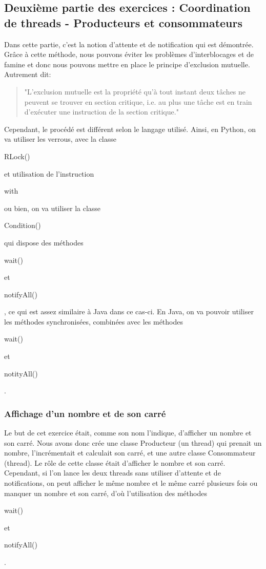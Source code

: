 \documentclass{article}
\begin{document}
\subsection{Deuxième partie des exercices : Coordination de threads - Producteurs et consommateurs}
\label{section : deuxiemepartie}

Dans cette partie, c'est la notion d'attente et de notification qui est démontrée. Grâce à cette méthode, nous pouvons éviter les problèmes d'interblocages et de famine et donc nous pouvons mettre en place le principe d'exclusion mutuelle. Autrement dit: \begin{quote}\begin{it}"L'exclusion mutuelle est la propriété qu'à tout instant deux tâches ne peuvent se trouver en section critique, i.e. au plus une tâche est en train d'exécuter une instruction de la section critique."\end{it}\end{quote}
Cependant, le procédé est différent selon le langage utilisé. Ainsi, en Python, on va utiliser les verrous, avec la classe \begin{it}RLock()\end{it} et utilisation de l'instruction \begin{it}with\end{it} ou bien, on va utiliser la classe \begin{it}Condition()\end{it} qui dispose des méthodes \begin{it}wait()\end{it} et \begin{it}notifyAll()\end{it}, ce qui est assez similaire à Java dans ce cas-ci.
En Java, on va pouvoir utiliser les méthodes synchronisées, combinées avec les méthodes \begin{it}wait()\end{it} et \begin{it}notityAll()\end{it}.

\subsubsection{Affichage d'un nombre et de son carré}
\label{section : carre}

Le but de cet exercice était, comme son nom l'indique, d'afficher un nombre et son carré. Nous avons donc crée une classe Producteur (un thread) qui prenait un nombre, l'incrémentait et calculait son carré, et une autre classe Consommateur (thread). Le rôle de cette classe était d'afficher le nombre et son carré. Cependant, si l'on lance les deux threads sans utiliser d'attente et de notifications, on peut afficher le même nombre et le même carré plusieurs fois ou manquer un nombre et son carré, d'où l'utilisation des méthodes \begin{it}wait()\end{it} et \begin{it}notifyAll()\end{it}.
\end{document}
